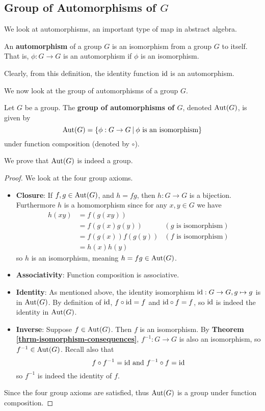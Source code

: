 \subsection{Group of Automorphisms of \texorpdfstring{$G$}{G}}
We look at automorphisms, an important type of map in abstract algebra.
\begin{definition}
    An \textbf{automorphism} of a group $G$ is an isomorphism from a group $G$ to itself. That is, $\phi: G \to G$ is an automorphism if $\phi$ is an isomorphism.
\end{definition}
Clearly, from this definition, the identity function $\mathrm{id}$ is an automorphism.

We now look at the group of automorphisms of a group $G$.
\begin{definition}
    Let $G$ be a group. The \textbf{group of automorphisms of $G$}, denoted $\mathrm{Aut}(G)$, is given by
    \[
        \Aut{G} = \{\phi: G \to G \vert \phi \text{ is an isomorphism}\}
    \]
    under function composition (denoted by $\circ$).
\end{definition}
We prove that $\mathrm{Aut}(G)$ is indeed a group.

\newpage

\begin{proof}
    We look at the four group axioms.
    \begin{itemize}
        \item \textbf{Closure}: If $f, g \in \mathrm{Aut}(G)$, and $h = fg$, then $h: G \to G$ is a bijection. Furthermore $h$ is a homomorphism since for any $x, y \in G$ we have
        \begin{align*}
            h(xy) &= f(g(xy))\\
            &= f(g(x)g(y)) & (g \text{ is isomorphism})\\
            &= f(g(x))f(g(y)) & (f \text{ is isomorphism})\\
            &= h(x)h(y)
        \end{align*}
        so $h$ is an isomorphism, meaning $h = fg \in \mathrm{Aut}(G)$.

        \item \textbf{Associativity}: Function composition is associative.

        \item \textbf{Identity}: As mentioned above, the identity isomorphism $\mathrm{id}: G \to G, g \mapsto g$ is in $\mathrm{Aut}(G)$. By definition of $\mathrm{id}$, $f \circ \mathrm{id} = f$ and $\mathrm{id} \circ f = f$, so $\mathrm{id}$ is indeed the identity in $\mathrm{Aut}(G)$.

        \item \textbf{Inverse}: Suppose $f \in \mathrm{Aut}(G)$. Then $f$ is an isomorphism. By \textbf{Theorem \ref{thrm-isomorphism-consequences}}, $f^{-1}: G \to G$ is also an isomorphism, so $f^{-1} \in \mathrm{Aut}(G)$. Recall also that
        \[
            f\circ f^{-1} = \mathrm{id} \text{ and } f^{-1}\circ f = \mathrm{id}
        \]
        so $f^{-1}$ is indeed the identity of $f$.
    \end{itemize}
    Since the four group axioms are satisfied, thus $\mathrm{Aut}(G)$ is a group under function composition.
\end{proof}

